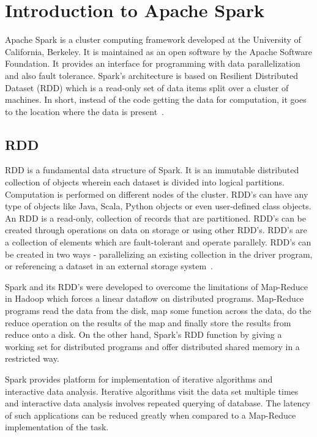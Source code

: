 \section{Introduction to Apache Spark}

Apache Spark is a cluster computing framework developed 
at the University of California, Berkeley. It is maintained as an open software 
by the Apache Software Foundation. It provides an interface for programming with 
data parallelization and also fault tolerance. Spark's architecture is based on 
Resilient Distributed Dataset (RDD) which is a read-only set of data items split
over a cluster of machines. In short, instead of the code getting the data for 
computation, it goes to the location where the data is present~\cite{hid-sp18-408-Spark}. 

\subsection{RDD}
RDD is a fundamental data structure of Spark. It is an immutable distributed 
collection of objects wherein each dataset is divided into logical partitions. 
Computation is performed on different nodes of the cluster. RDD's can have any 
type of objects like Java, Scala, Python objects or even user-defined class 
objects. An RDD is a read-only, collection of records that are partitioned. 
RDD's can be created through operations on data on storage or using other RDD's.
RDD's are a collection of elements which are fault-tolerant and operate 
parallely. RDD's can be created in two ways - parallelizing an existing 
collection in the driver program, or referencing a dataset in an external 
storage system~\cite{hid-sp18-408-Spark-RDD}.

Spark and its RDD's were developed to overcome the limitations of Map-Reduce in 
Hadoop which forces a linear dataflow on distributed programs. Map-Reduce 
programs read the data from the disk, map some function across the data, do the 
reduce operation on the results of the map and finally store the results from 
reduce onto a disk. On the other hand, Spark's RDD function by giving a working 
set for distributed programs and offer distributed shared memory in a restricted
way. 

Spark provides platform for implementation of iterative algorithms and 
interactive data analysis. Iterative algorithms visit the data set multiple 
times and interactive data analysis involves repeated querying of database. 
The latency of such applications can be reduced greatly when compared to a 
Map-Reduce implementation of the task. 

